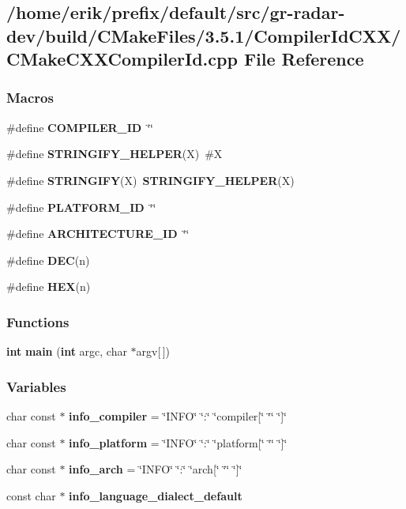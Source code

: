 \subsection{/home/erik/prefix/default/src/gr-\/radar-\/dev/build/\+C\+Make\+Files/3.5.1/\+Compiler\+Id\+C\+X\+X/\+C\+Make\+C\+X\+X\+Compiler\+Id.cpp File Reference}
\label{gr-radar-dev_2build_2CMakeFiles_23_85_81_2CompilerIdCXX_2CMakeCXXCompilerId_8cpp}
\subsubsection*{Macros}
\begin{DoxyCompactItemize}
\item 
\#define {\bf C\+O\+M\+P\+I\+L\+E\+R\+\_\+\+ID}~\char`\"{}\char`\"{}
\item 
\#define {\bf S\+T\+R\+I\+N\+G\+I\+F\+Y\+\_\+\+H\+E\+L\+P\+ER}(X)~\#X
\item 
\#define {\bf S\+T\+R\+I\+N\+G\+I\+FY}(X)~{\bf S\+T\+R\+I\+N\+G\+I\+F\+Y\+\_\+\+H\+E\+L\+P\+ER}(X)
\item 
\#define {\bf P\+L\+A\+T\+F\+O\+R\+M\+\_\+\+ID}~\char`\"{}\char`\"{}
\item 
\#define {\bf A\+R\+C\+H\+I\+T\+E\+C\+T\+U\+R\+E\+\_\+\+ID}~\char`\"{}\char`\"{}
\item 
\#define {\bf D\+EC}(n)
\item 
\#define {\bf H\+EX}(n)
\end{DoxyCompactItemize}
\subsubsection*{Functions}
\begin{DoxyCompactItemize}
\item 
{\bf int} {\bf main} ({\bf int} argc, char $\ast$argv[$\,$])
\end{DoxyCompactItemize}
\subsubsection*{Variables}
\begin{DoxyCompactItemize}
\item 
char const $\ast$ {\bf info\+\_\+compiler} = \char`\"{}I\+N\+FO\char`\"{} \char`\"{}\+:\char`\"{} \char`\"{}compiler[\char`\"{} \char`\"{}\char`\"{} \char`\"{}]\char`\"{}
\item 
char const $\ast$ {\bf info\+\_\+platform} = \char`\"{}I\+N\+FO\char`\"{} \char`\"{}\+:\char`\"{} \char`\"{}platform[\char`\"{} \char`\"{}\char`\"{} \char`\"{}]\char`\"{}
\item 
char const $\ast$ {\bf info\+\_\+arch} = \char`\"{}I\+N\+FO\char`\"{} \char`\"{}\+:\char`\"{} \char`\"{}arch[\char`\"{} \char`\"{}\char`\"{} \char`\"{}]\char`\"{}
\item 
const char $\ast$ {\bf info\+\_\+language\+\_\+dialect\+\_\+default}
\end{DoxyCompactItemize}


